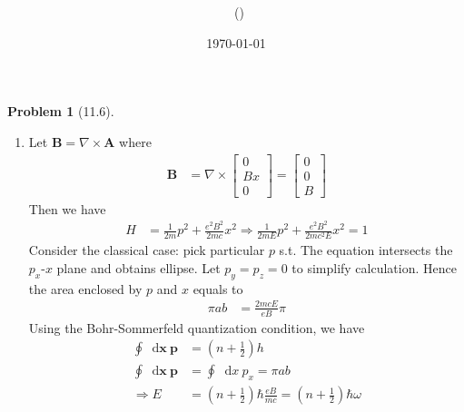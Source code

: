 \documentclass[twoside,11pt]{article}
\title{{\lms \Code \ \Ass}}
\author{\lms \name \ (\href{mailto:\mail}{\mail})}
\date{\sffamily \today}
\makeatletter
\renewcommand*\d{\mathop{}\!\mathrm{d}}
\theoremstyle{definition}
\newtheorem{problem}{Problem}
\theoremstyle{remark}
\newtheorem*{remark}{Remark}
\renewcommand{\maketitle}{\bgroup\setlength{\parindent}{0pt}
\begin{flushleft}
  \textbf{\Large\@title}

  \@author
\end{flushleft}\egroup
}
\makeatother
\begin{document}
\maketitle
\thispagestyle{title}



\begin{problem}[11.6]\
\begin{enumerate}[label=(\alph*)]
\item 
Let $\mathbf{B} = \nabla\times\mathbf{A}$ where
\begin{align*}
    \mathbf{B} &= \nabla\times\begin{bmatrix}
        0 \\ Bx \\ 0
    \end{bmatrix} = \begin{bmatrix}
        0 \\ 0 \\ B
    \end{bmatrix}
\end{align*}
Then we have
\begin{align*}
    H &= \frac{1}{2m}p^2 + \frac{e^2B^2}{2mc}x^2\Rightarrow
    \frac{1}{2mE}p^2 + \frac{e^2B^2}{2mc^2E}x^2 = 1
\end{align*}
Consider the classical case: pick particular $p$ s.t.
The equation intersects the $p_x$-$x$ plane and obtains ellipse.
Let $p_y=p_z=0$ to simplify calculation.
Hence the area enclosed by $p$ and $x$ equals to 
\begin{align*}
    \pi a b &= \frac{2mcE}{eB}\pi 
\end{align*}
Using the Bohr-Sommerfeld quantization condition, we have
\begin{align*}
    \oint\d\mathbf{x}\ \mathbf{p} &= \left(n+\frac{1}{2}\right)h\\
    \oint\d\mathbf{x}\ \mathbf{p} &= \oint\d x\ p_x = \pi ab\\
    \Rightarrow E &= \left(n+\frac{1}{2}\right)\hbar\frac{eB}{mc}
    = \left(n+\frac{1}{2}\right)\hbar\omega
\end{align*}



\end{enumerate}
\end{problem}
\end{document}
